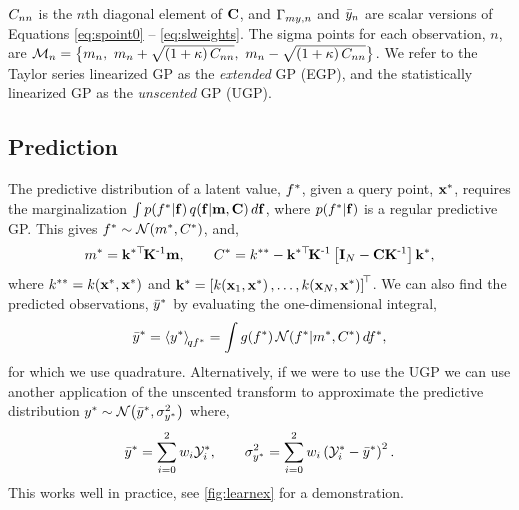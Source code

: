 \documentclass{article} %
\begin{document}
$C_{nn}$ is the $n$th diagonal element of $\mathbf{C}$, and
$\Gamma_{my,n}$ and $\bar{y}_n$ are scalar versions of Equations
\eqref{eq:spoint0} -- \eqref{eq:slweights}. The sigma points for each
observation, $n$, are $\mathcal{M}_{n} = \big\{m_n,~m_n +
\sqrt{\left({1 + \kappa}\right)C_{nn}},~m_n - \sqrt{\left({1 +
        \kappa}\right)C_{nn}}\big\}$. We refer to the Taylor series linearized
GP as the \emph{extended} GP (EGP), and the statistically linearized GP as the
\emph{unscented} GP (UGP). 


\subsection{Prediction}

The predictive distribution of a latent value, $f^{*}$, given a query
point, $\mathbf{x}^{*}$, requires the marginalization $\int
p\!\left({f^{*}}\middle\vert{\ensuremath{\mathbf{f}}}\right)q\!\left({\mathbf{f}}\middle\vert{\ensuremath{\mathbf{m}}, \ensuremath{\mathbf{C}}}\right) d\mathbf{f}$, where
$p\!\left({f^{*}}\middle\vert{\ensuremath{\mathbf{f}}}\right)$ is a regular predictive GP. This gives
$f^{*} \sim \mathcal{N}\!\left({m^{*}, C^{*}}\right)$, and,
\begin{equation}
    m^{*} = \mathbf{k}^{*\top}\!\mathbf{K}^{\text{-}1}\mathbf{m},
    \qquad
    C^{*} = k^{**} - \mathbf{k}^{*\top}\!\mathbf{K}^{\text{-}1}\left[{\mathbf{I}_{N} -
        \mathbf{C}\mathbf{K}^{\text{-}1}}\right]\mathbf{k}^{*},
\end{equation}
where $k^{**} = k\!\left({\mathbf{x}^{*}, \mathbf{x}^{*}}\right)$ and $\mathbf{k}^{*}
= \left[{k\!\left({\mathbf{x}_1, \mathbf{x}^{*}}\right), \ldots, k\!\left({\mathbf{x}_N,
        \mathbf{x}^{*}}\right)}\right]^{\!\top}$. We can also find the predicted observations,
$\bar{y}^{*}$ by evaluating the one-dimensional integral,
\begin{equation}
    \bar{y}^{*} = \left\langle{\ensuremath{y}\ensuremath{^{*}}}\right\rangle_{\!{qf^{*}}} = \int
        g\!\left({{f^{*}}}\right) \mathcal{N}\!\left({f^{*}}\middle\vert{\ensuremath{m}\ensuremath{^{*}},
            \ensuremath{C}\ensuremath{^{*}}}\right) df^{*},
\end{equation}
for which we use quadrature.
Alternatively, if we were to use the UGP we can use another
application of the unscented transform to approximate the predictive
distribution $y^{*} \sim \mathcal{N}\!\left({\bar{y}^{*}, \sigma^2_{y^{*}}}\right)$ where,
\begin{equation}
    \bar{y}^{*} = \sum^2_{i=0} w_i \mathcal{Y}_i^{*}, \qquad 
    \sigma^2_{y^{*}} = \sum^2_{i=0} w_i \left({\mathcal{Y}_i^{*} -
        \bar{y}^{*}}\right)^2.
    \label{eq:slpred}
\end{equation}
This works well in practice, see \autoref{fig:learnex} for a demonstration.
\end{document}
